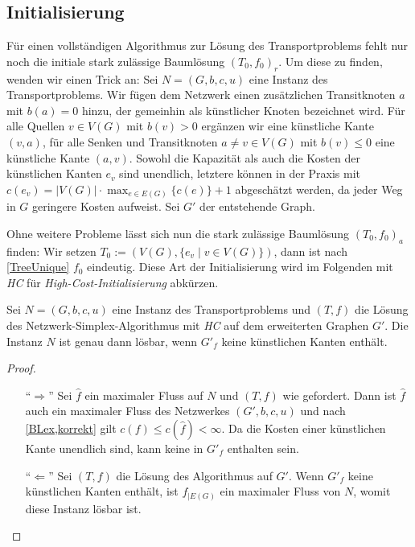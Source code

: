 \subsection{Initialisierung} \label{ch:init}
Für einen vollständigen Algorithmus zur Lösung des Transportproblems fehlt nur noch die initiale stark zulässige Baumlösung $(T_0,f_0)_r$. Um diese zu finden, wenden wir einen Trick an: Sei $N=(G,b,c,u)$ eine Instanz des Transportproblems. Wir fügen dem Netzwerk einen zusätzlichen Transitknoten $a$ mit $b(a)=0$ hinzu, der gemeinhin als künstlicher Knoten bezeichnet wird. Für alle Quellen $v\in V(G)$ mit $b(v)>0$ ergänzen wir eine künstliche Kante $(v,a)$, für alle Senken und Transitknoten $a\neq v\in V(G)$ mit $b(v)\leq0$ eine künstliche Kante $(a,v)$. Sowohl die Kapazität als auch die Kosten der künstlichen Kanten $e_v$ sind unendlich, letztere können in der Praxis mit $c(e_v)=|V(G)|\cdot\max_{e\in E(G)}\{c(e)\}+1$ abgeschätzt werden, da jeder Weg in $G$ geringere Kosten aufweist. Sei $G'$ der entstehende Graph.

Ohne weitere Probleme lässt sich nun die stark zulässige Baumlösung $(T_0,f_0)_a$ finden: Wir setzen $T_0:=(V(G),\{e_v\mid v\in V(G)\})$, dann ist nach \cref{TreeUnique} $f_0$ eindeutig. Diese Art der Initialisierung wird im Folgenden mit \emph{HC} für \emph{High-Cost-Initialisierung} abkürzen.

\begin{lem}\label{Init}Sei $N=(G,b,c,u)$ eine Instanz des Transportproblems und $(T,f)$ die Lösung des Netzwerk-Simplex-Algorithmus mit \emph{HC} auf dem erweiterten Graphen $G'$. Die Instanz $N$ ist genau dann lösbar, wenn $G'_f$ keine künstlichen Kanten enthält.\end{lem}
\begin{proof}\label{solvable}\mbox{}
\begin{itemize}[topsep=0pt]
	\item[\enquote{$\Rightarrow$}] Sei $\hat{f}$ ein maximaler Fluss auf $N$ und $(T,f)$ wie gefordert. Dann ist $\hat{f}$ auch ein maximaler Fluss des Netzwerkes $(G',b,c,u)$ und nach \cref{BLex,korrekt} gilt $c(f)\leq c(\hat{f})<\infty$. Da die Kosten einer künstlichen Kante unendlich sind, kann keine in $G'_f$ enthalten sein.
	
	\item[\enquote{$\Leftarrow$}] Sei $(T,f)$ die Lösung des Algorithmus auf $G'$. Wenn $G'_f$ keine künstlichen Kanten enthält, ist $f_{|E(G)}$ ein maximaler Fluss von $N$, womit diese Instanz lösbar ist.\qedhere
\end{itemize}
\end{proof}

